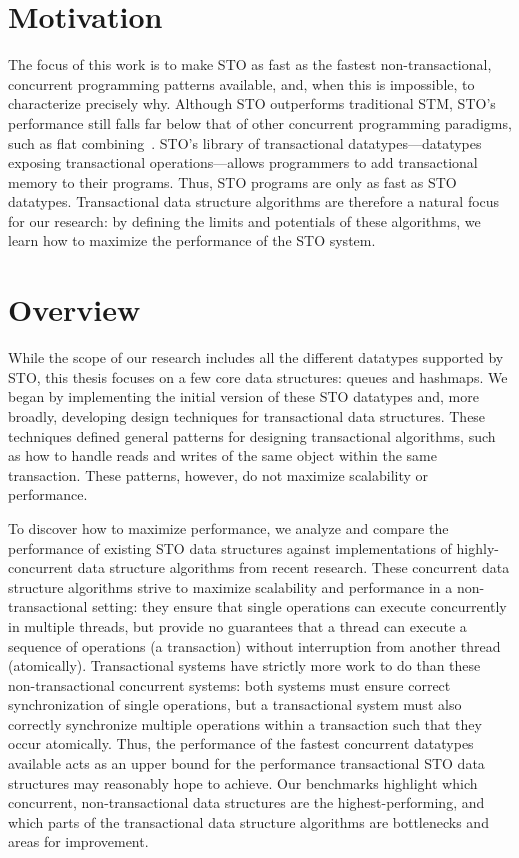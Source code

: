 \section{Motivation}
The focus of this work is to make STO as fast as the fastest non-transactional, concurrent programming patterns available, and, when this is impossible, to characterize precisely why. Although STO outperforms traditional STM, STO’s performance still falls far below that of other concurrent programming paradigms, such as flat combining~\cite{flatcombining}. STO’s library of transactional datatypes---datatypes exposing transactional operations---allows programmers to add transactional memory to their programs. Thus, STO programs are only as fast as STO datatypes. Transactional data structure algorithms are therefore a natural focus for our research: by defining the limits and potentials of these algorithms, we learn how to maximize the performance of the STO system.

\section{Overview}
While the scope of our research includes all the different datatypes supported by STO, this thesis focuses on a few core data structures: queues and hashmaps. We began by implementing the initial version of these STO datatypes and, more broadly, developing design techniques for transactional data structures. These techniques defined general patterns for designing transactional algorithms, such as how to handle reads and writes of the same object within the same transaction. These patterns, however, do not maximize scalability or performance.

To discover how to maximize performance, we analyze and compare the performance of existing STO data structures against implementations of highly-concurrent data structure algorithms from recent research. These concurrent data structure algorithms strive to maximize scalability and performance in a non-transactional setting: they ensure that single operations can execute concurrently in multiple threads, but provide no guarantees that a thread can execute a sequence of operations (a transaction) without interruption from another thread (atomically).
Transactional systems have strictly more work to do than these non-transactional concurrent systems: both systems must ensure correct synchronization of single operations, but a transactional system must also correctly synchronize multiple operations within a transaction such that they occur atomically.
Thus, the performance of the fastest concurrent datatypes available acts as an upper bound for the performance transactional STO data structures may reasonably hope to achieve. Our benchmarks highlight which concurrent, non-transactional data structures are the highest-performing, and which parts of the transactional data structure algorithms are bottlenecks and areas for improvement. 

